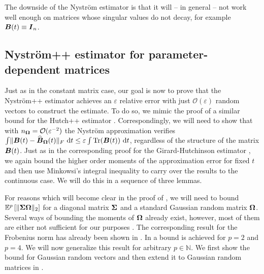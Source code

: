 \documentclass[12pt]{article}
\begin{document}

The downside of the Nyström estimator is that it will -- in general -- not work well enough on matrices whose singular values do not decay, for example $\boldsymbol{B}(t) \equiv \boldsymbol{I}_n$.

\subsection{Nyström++ estimator for parameter-dependent matrices}
\label{subsec:nystrom-pp}

Just as in the constant matrix case, our goal is now to prove that the Nyström++ estimator  achieves an $\varepsilon$ relative error with just $\mathcal{O}(\varepsilon)$ random vectors to construct the estimate. To do so, we mimic the proof of a similar bound for the Hutch++ estimator \cite[theorem 3.1]{meyer-2021-hutch-optimal}. Correspondingly, we will need to show that with $n_{\boldsymbol{\Omega}} = \mathcal{O}(\varepsilon^{-2})$ the Nyström approximation verifies $\int \lVert \boldsymbol{B}(t) - \widehat{\boldsymbol{B}}_{\boldsymbol{\Omega}}(t)\rVert _F~\mathrm{d}t \leq \varepsilon \int \operatorname{Tr}(\boldsymbol{B}(t))~\mathrm{d}t$, regardless of the structure of the matrix $\boldsymbol{B}(t)$. Just as in the corresponding proof for the Girard-Hutchinson estimator , we again bound the higher order moments of the approximation error for fixed $t$ and then use Minkowsi's integral inequality to carry over the results to the continuous case. We will do this in a sequence of three lemmas.

For reasons which will become clear in the proof of , we will need to bound $\mathbb{E}^{p}\left[\lVert \boldsymbol{\Sigma} \boldsymbol{\Omega} \rVert _2 \right]$ for a diagonal matrix $\boldsymbol{\Sigma}$ and a standard Gaussian random matrix $\boldsymbol{\Omega}$. Several ways of bounding the moments of $\boldsymbol{\Omega}$ already exist, however, most of them are either not sufficient for our purposes \cite{chen-2005-condition-numbers, edelman-1988-eigenvalues-condition, james-1964-distributions-matrix}. The corresponding result for the Frobenius norm has already been shown in \cite{kressner-2023-randomized-lowrank}. In \cite[lemma B.1]{tropp-2023-randomized-algorithms} a bound is achieved for $p = 2$ and $p = 4$. We will now generalize this result for arbitrary $p \in \mathbb{N}$. We first show the bound for Gaussian random vectors and then extend it to Gaussian random matrices in .
\end{document}
